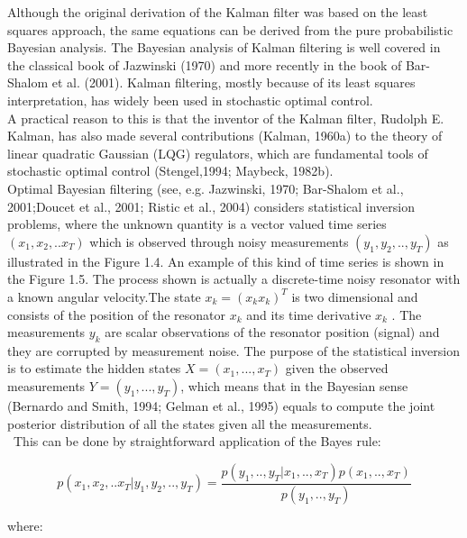 \documentclass[10pt]{llncs}
\begin{document}
Although the original derivation of the Kalman filter was based on the least squares approach, the same equations can be derived from the pure probabilistic Bayesian analysis. The Bayesian analysis of Kalman filtering is well covered in the classical book of Jazwinski (1970) and more recently in the book of Bar-Shalom et al. (2001). Kalman filtering, mostly because of its least squares interpretation, has widely been used in stochastic optimal control. \\
A practical reason to this is that the inventor of the Kalman filter, Rudolph E. Kalman, has also made several contributions (Kalman, 1960a) to the theory of linear quadratic Gaussian (LQG) regulators, which are fundamental tools of stochastic optimal control (Stengel,1994; Maybeck, 1982b).\\ 
Optimal Bayesian filtering (see, e.g. Jazwinski, 1970; Bar-Shalom et al., 2001;Doucet et al., 2001; Ristic et al., 2004) considers statistical inversion problems, where the unknown quantity is a vector valued time series $(x_1 , x_2 , . . x_T)$ which is observed through noisy measurements $(y_1 , y_2 , . . ,y_T)$ as illustrated in the Figure 1.4.
An example of this kind of time series is shown in the Figure 1.5. 
The process shown is actually a discrete-time noisy resonator with a known angular velocity.The state $ x_k = ( x_{k}  x_k )^T $ is two dimensional and consists of the position of the resonator $x_k$ and its time derivative $x_k$ . The measurements $y_k$ are scalar observations of the resonator position (signal) and they are corrupted by measurement noise.
The purpose of the statistical inversion is to estimate the hidden states 
$X=(x_1 , . . . , x_T)$ given the observed measurements $Y=(y_1 , . . . , y_T)$, which means that in the Bayesian sense (Bernardo and Smith, 1994; Gelman et al., 1995) equals to compute the joint posterior distribution of all the states given all the measurements.\\\
This can be done by straightforward application of the Bayes rule:

\begin{equation}  \label{eqn: Bayes rule}
p(x_1 , x_2 , . . x_T | y_1 , y_2 , . . ,y_T)=
\frac{ p(y_1 , . . ,y_T | x_1 , . ., x_T  ) p(x_1 , . . ,x_T) }{p(y_1,..,y_T)}
\end{equation}

where:
\end{document}
